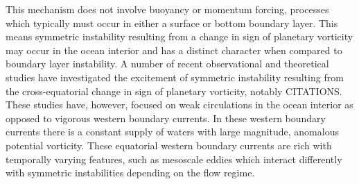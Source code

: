 This mechanism does not involve buoyancy or momentum forcing, processes which typically must occur in either a surface or bottom boundary layer. This means symmetric instability resulting from a change in sign of planetary vorticity may occur in the ocean interior and has a distinct character when compared to boundary layer instability. A number of recent observational and theoretical studies have investigated the excitement of symmetric instability resulting from the cross-equatorial change in sign of planetary vorticity, notably CITATIONS. These studies have, however, focused on weak circulations in the ocean interior as opposed to vigorous western boundary currents. In these western boundary currents there is a constant supply of waters with large magnitude, anomalous potential vorticity. These equatorial western boundary currents are rich with temporally varying features, such as mesoscale eddies which interact differently with symmetric instabilities depending on the flow regime.